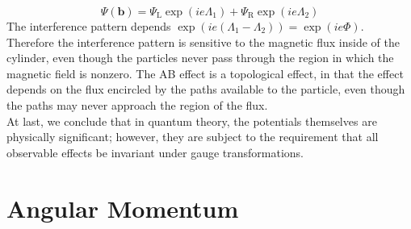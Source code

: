 \[\Psi(\bm{b}) = \Psi_{\mathrm{L}}\exp(ie\Lambda_1) + \Psi_{\mathrm{R}}\exp(ie\Lambda_2)\]
The interference pattern depends $\exp(ie(\Lambda_1-\Lambda_2)) = \exp(ie\Phi)$. 
Therefore the interference pattern is sensitive to the magnetic flux inside of the cylinder, even though the particles never pass through the region in which the magnetic field is nonzero. 
The AB effect is a topological effect, in that the effect depends on the flux encircled by the paths available to the particle, even though the paths may never approach the region of the flux. \\
At last, we conclude that in quantum theory, the potentials themselves are physically significant; however, they are subject to the requirement that all observable effects be invariant under gauge transformations.

\chapter{Angular Momentum}
